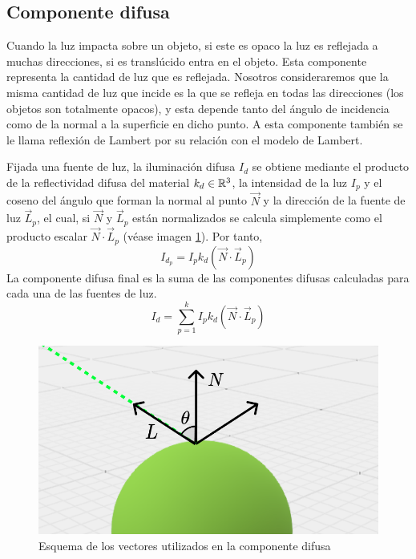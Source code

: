 \subsection{Componente difusa}

Cuando la luz impacta sobre un objeto, si este es opaco la luz es reflejada a muchas direcciones, si es translúcido entra en el objeto. Esta componente representa la cantidad de luz que es reflejada. Nosotros consideraremos que la misma cantidad de luz que incide es la que se refleja en todas las direcciones (los objetos son totalmente opacos), y esta depende tanto del ángulo de incidencia como de la normal a la superficie en dicho punto. A esta componente también se le llama reflexión de Lambert por su relación con el modelo de Lambert.

Fijada una fuente de luz, la iluminación difusa $I_d$ se obtiene mediante el producto de la reflectividad difusa del material $k_d\in\mathbb{R}^3$, la intensidad de la luz $I_p$ y el coseno del ángulo que forman la normal al punto $\vec N$ y la dirección de la fuente de luz $\vec L_p$, el cual, si $\vec N$ y $\vec L_p$ están normalizados se calcula simplemente como el producto escalar $\vec N\cdot \vec L_p$ (véase imagen \ref{fig:difusa}). Por tanto,
\begin{equation}
    I_{d_p} = I_p k_d (\vec N\cdot \vec L_p)
\end{equation}
La componente difusa final es la suma de las componentes difusas calculadas para cada una de las fuentes de luz.
\begin{equation}
    I_d = \sum_{p=1}^k I_p k_d (\vec N\cdot \vec L_p)
\end{equation}

\begin{figure} [ht]
    \centering
    \includegraphics[scale = 0.35]{img/C7/difusa.png}
    \caption{Esquema de los vectores utilizados en la componente difusa}
    \label{fig:difusa}
\end{figure}

